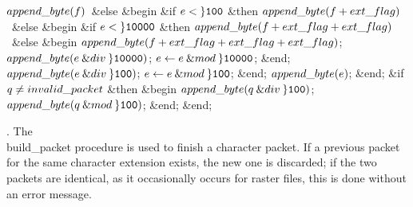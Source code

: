 $\\{append\_byte}(\|f)$\ \&{else} \2\6
\&{begin} \&{if} $\|e<\H{100}$ \1\&{then}\5
$\\{append\_byte}(\|f+\\{ext\_flag})$\ \&{else} \2\6
\&{begin} \&{if} $\|e<\H{10000}$ \1\&{then}\5
$\\{append\_byte}(\|f+\\{ext\_flag}+\\{ext\_flag})$\ \&{else} \2\6
\&{begin} $\\{append\_byte}(\|f+\\{ext\_flag}+\\{ext\_flag}+\\{ext\_flag})$;%
\5
$\\{append\_byte}(\|e\mathbin{\&{div}}\H{10000})$;\5
$\|e\K\|e\mathbin{\&{mod}}\H{10000}$;\6
\&{end};\5
$\\{append\_byte}(\|e\mathbin{\&{div}}\H{100})$;\5
$\|e\K\|e\mathbin{\&{mod}}\H{100}$;\6
\&{end};\5
$\\{append\_byte}(\|e)$;\6
\&{end};\6
\&{if} $\|q\I\\{invalid\_packet}$ \1\&{then}\6
\&{begin} $\\{append\_byte}(\|q\mathbin{\&{div}}\H{100})$;\5
$\\{append\_byte}(\|q\mathbin{\&{mod}}\H{100})$;\6
\&{end};\2\6
\&{end};\par
\fi

. The \\{build\_packet} procedure is used to finish a character packet.
If a previous packet for the same character extension exists, the new
one is discarded; if the two packets are identical, as it occasionally
occurs for raster files, this is done without an error message.

